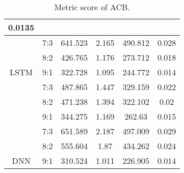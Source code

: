 \documentclass{ieeeojies}
\begin{document}
{\begin{table}[H]
\begin{tabular}{|cccccc|}
  0.0135 \\ \hline
\multicolumn{1}{|c|}{} &
  \multicolumn{1}{c|}{7:3} &
  \multicolumn{1}{c|}{\cellcolor[HTML]{FFFFFF}641.523} &
  \multicolumn{1}{c|}{\cellcolor[HTML]{FFFFFF}2.165} &
  \multicolumn{1}{c|}{\cellcolor[HTML]{FFFFFF}490.812} &
  \cellcolor[HTML]{FFFFFF}0.028 \\ \cline{2-6} 
\multicolumn{1}{|c|}{} &
  \multicolumn{1}{c|}{8:2} &
  \multicolumn{1}{c|}{\cellcolor[HTML]{FFFFFF}426.765} &
  \multicolumn{1}{c|}{\cellcolor[HTML]{FFFFFF}1.176} &
  \multicolumn{1}{c|}{\cellcolor[HTML]{FFFFFF}273.712} &
  \cellcolor[HTML]{FFFFFF}0.018 \\ \cline{2-6} 
\multicolumn{1}{|c|}{\multirow{-3}{*}{LSTM}} &
  \multicolumn{1}{c|}{\cellcolor[HTML]{FFFFFF}9:1} &
  \multicolumn{1}{c|}{\cellcolor[HTML]{FFFFFF}322.728} &
  \multicolumn{1}{c|}{\cellcolor[HTML]{FFFFFF}1.095} &
  \multicolumn{1}{c|}{\cellcolor[HTML]{FFFFFF}244.772} &
  \cellcolor[HTML]{FFFFFF}0.014 \\ \hline
\rowcolor[HTML]{E6EFFD} 
\multicolumn{1}{|c|}{\cellcolor[HTML]{E6EFFD}} &
  \multicolumn{1}{c|}{\cellcolor[HTML]{E6EFFD}7:3} &
  \multicolumn{1}{c|}{\cellcolor[HTML]{E6EFFD}487.865} &
  \multicolumn{1}{c|}{\cellcolor[HTML]{E6EFFD}1.447} &
  \multicolumn{1}{c|}{\cellcolor[HTML]{E6EFFD}329.159} &
  0.022 \\ \cline{2-6} 
\rowcolor[HTML]{E6EFFD} 
\multicolumn{1}{|c|}{\cellcolor[HTML]{E6EFFD}} &
  \multicolumn{1}{c|}{\cellcolor[HTML]{E6EFFD}8:2} &
  \multicolumn{1}{c|}{\cellcolor[HTML]{E6EFFD}471.238} &
  \multicolumn{1}{c|}{\cellcolor[HTML]{E6EFFD}1.394} &
  \multicolumn{1}{c|}{\cellcolor[HTML]{E6EFFD}322.102} &
  0.02 \\ \cline{2-6} 
\rowcolor[HTML]{E6EFFD} 
\multicolumn{1}{|c|}{\multirow{-3}{*}{\cellcolor[HTML]{E6EFFD}CNN-GRU}} &
  \multicolumn{1}{c|}{\cellcolor[HTML]{E6EFFD}9:1} &
  \multicolumn{1}{c|}{\cellcolor[HTML]{E6EFFD}344.275} &
  \multicolumn{1}{c|}{\cellcolor[HTML]{E6EFFD}1.169} &
  \multicolumn{1}{c|}{\cellcolor[HTML]{E6EFFD}262.63} &
  0.015 \\ \hline
\multicolumn{1}{|c|}{} &
  \multicolumn{1}{c|}{7:3} &
  \multicolumn{1}{c|}{\cellcolor[HTML]{FFFFFF}651.589} &
  \multicolumn{1}{c|}{\cellcolor[HTML]{FFFFFF}2.187} &
  \multicolumn{1}{c|}{\cellcolor[HTML]{FFFFFF}497.009} &
  \cellcolor[HTML]{FFFFFF}0.029 \\ \cline{2-6} 
\multicolumn{1}{|c|}{} &
  \multicolumn{1}{c|}{8:2} &
  \multicolumn{1}{c|}{\cellcolor[HTML]{FFFFFF}555.604} &
  \multicolumn{1}{c|}{\cellcolor[HTML]{FFFFFF}1.87} &
  \multicolumn{1}{c|}{\cellcolor[HTML]{FFFFFF}434.262} &
  \cellcolor[HTML]{FFFFFF}0.024 \\ \cline{2-6} 
\multicolumn{1}{|c|}{\multirow{-3}{*}{DNN}} &
  \multicolumn{1}{c|}{\cellcolor[HTML]{FFFFFF}9:1} &
  \multicolumn{1}{c|}{\cellcolor[HTML]{FFFFFF}310.524} &
  \multicolumn{1}{c|}{\cellcolor[HTML]{E6EFFD}1.011} &
  \multicolumn{1}{c|}{\cellcolor[HTML]{FFFFFF}226.905} &
  \cellcolor[HTML]{FFFFFF}0.014 \\ \hline
\end{tabular}
\caption{\centering Metric score of ACB.}
\end{table}

}
\end{document}
